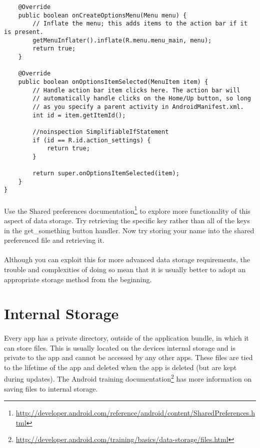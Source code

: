 \begin{lstlisting}
    @Override
    public boolean onCreateOptionsMenu(Menu menu) {
        // Inflate the menu; this adds items to the action bar if it is present.
        getMenuInflater().inflate(R.menu.menu_main, menu);
        return true;
    }

    @Override
    public boolean onOptionsItemSelected(MenuItem item) {
        // Handle action bar item clicks here. The action bar will
        // automatically handle clicks on the Home/Up button, so long
        // as you specify a parent activity in AndroidManifest.xml.
        int id = item.getItemId();

        //noinspection SimplifiableIfStatement
        if (id == R.id.action_settings) {
            return true;
        }

        return super.onOptionsItemSelected(item);
    }
}

\end{lstlisting}

\paragraph{} Use the Shared preferences documentation\footnote{\url{http://developer.android.com/reference/android/content/SharedPreferences.html}} to explore more functionality of this aspect of data storage. Try retrieving the specific key rather than all of the keys in the get\_something button handler. Now try storing your name into the shared preferenced file and retrieving it.

\paragraph{} Although you can exploit this for more advanced data storage requirements, the trouble and complexities of doing so mean that it is usually better to adopt an appropriate storage method from the beginning.

\section{Internal Storage}
\paragraph{} Every app has a private directory, outside of the application bundle, in which it can store files. This is usually located on the devices internal storage and is private to the app and cannot be accessed by any other apps. These files are tied to the lifetime of the app and deleted when the app is deleted (but are kept during updates). The Android training documentation\footnote{\url{http://developer.android.com/training/basics/data-storage/files.html}} has more information on saving files to internal storage.

